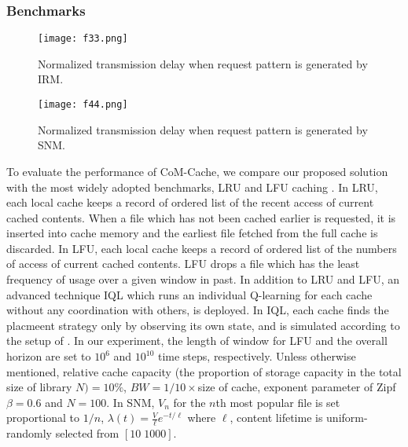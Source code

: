 \documentclass[journal,onecolumn]{IEEEtran}
\begin{document}
\subsubsection{Benchmarks}



\begin{figure*}
\centering
\begin{minipage}[b]{.45\textwidth}
  \texttt{[image: f33.png]}
\caption{ Normalized transmission delay when request pattern is generated by IRM.}\label{cache:fig33}
\end{minipage}\qquad
\begin{minipage}[b]{.45\textwidth}
  \texttt{[image: f44.png]}
\caption{ Normalized transmission delay when request pattern is generated by SNM. }\label{cache:fig44}
\end{minipage}
\end{figure*}


To evaluate the performance of CoM-Cache, we compare our proposed solution with the most widely adopted benchmarks, LRU and LFU caching \cite{ahmed2013analyzing}. In LRU, each local cache keeps a record of ordered list of the recent access of current cached contents. When a file which has not been cached earlier is requested, it is inserted into cache memory and the earliest file fetched from the full cache is discarded. In LFU, each local cache keeps a record of ordered list of the numbers of access of current cached contents. LFU drops a file which has the least frequency of usage over a given window in past. 
In addition to LRU and LFU, an advanced technique IQL which runs an individual Q-learning for each cache without any coordination with others, is deployed. In IQL, each cache finds the placmeent strategy only by observing its own state, and is simulated according to the setup of \cite{sung2016efficient}. 
In our experiment, the length of window for LFU and the overall horizon are set to $10^6$ and $10^{10}$ time steps, respectively.
Unless otherwise mentioned, relative cache capacity (the proportion of storage capacity in the total size of library $N) = 10\%$, $BW=1/10 \times$size of cache, exponent parameter of Zipf $\beta =0.6$ and $N=100$. In SNM, $V_n$ for the $n$th most popular file is set proportional to $1/n$, $\lambda(t)=\frac{V}\ell e^{-t/\ell}$ where $\ell$, content lifetime is uniform-randomly selected from $[10 \; 1000]$. 



\end{document}
